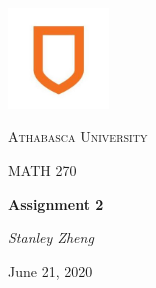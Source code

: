 \documentclass[11pt, letterpaper, twoside]{article}
\begin{document}
\begin{titlepage}
	\centering
	\vspace*{60px}
	\hspace{0pt}
	\includegraphics[width=0.2\textwidth]{logo}\par\vspace{1cm}
	{\scshape\LARGE Athabasca University \par}
	\vspace{1cm}
	{\scshape\Large MATH 270\par}
	\vspace{1.5cm}
	{\huge\bfseries Assignment 2\par}
	\vspace{2cm}
	{\Large\itshape Stanley Zheng\par}
	\vfill
	{\large June 21, 2020\par}
	\vspace*{50px}
	\hspace{0pt}
\pagebreak
\end{titlepage}
\end{document}
